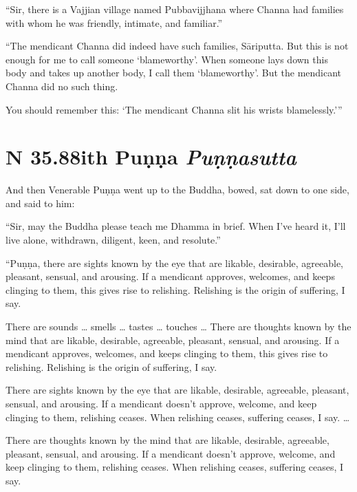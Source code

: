 \documentclass[12pt,openany]{book}%
\newcommand*{\suttatitleacronym}[1]{\smaller[2]{#1}\vspace*{.3em}}
\newcommand*{\suttatitletranslation}[1]{\linebreak{#1}}
\newcommand*{\suttatitleroot}[1]{\linebreak\smaller[2]\itshape{#1}}
\newcommand*{\tocacronym}[1]{\hspace*{-3.3em}{#1}\quad}
\newcommand*{\toctranslation}[1]{#1}
\newcommand*{\tocroot}[1]{(\textit{#1})}
\begin{document}
“Sir, there is a Vajjian village named Pubbavijjhana where Channa had families with whom he was friendly, intimate, and familiar.” 

“The mendicant Channa did indeed have such families, \textsanskrit{Sāriputta}. But this is not enough for me to call someone ‘blameworthy’. When someone lays down this body and takes up another body, I call them ‘blameworthy’. But the mendicant Channa did no such thing. 

You should remember this: ‘The mendicant Channa slit his wrists blamelessly.’” 

%
\section*{{\suttatitleacronym SN 35.88}{\suttatitletranslation With Puṇṇa }{\suttatitleroot Puṇṇasutta}}
\addcontentsline{toc}{section}{\tocacronym{SN 35.88} \toctranslation{With Puṇṇa } \tocroot{Puṇṇasutta}}

And then Venerable \textsanskrit{Puṇṇa} went up to the Buddha, bowed, sat down to one side, and said to him: 

“Sir, may the Buddha please teach me Dhamma in brief. When I’ve heard it, I’ll live alone, withdrawn, diligent, keen, and resolute.” 

“\textsanskrit{Puṇṇa}, there are sights known by the eye that are likable, desirable, agreeable, pleasant, sensual, and arousing. If a mendicant approves, welcomes, and keeps clinging to them, this gives rise to relishing. Relishing is the origin of suffering, I say. 

There are sounds … smells … tastes … touches … There are thoughts known by the mind that are likable, desirable, agreeable, pleasant, sensual, and arousing. If a mendicant approves, welcomes, and keeps clinging to them, this gives rise to relishing. Relishing is the origin of suffering, I say. 

There are sights known by the eye that are likable, desirable, agreeable, pleasant, sensual, and arousing. If a mendicant doesn’t approve, welcome, and keep clinging to them, relishing ceases. When relishing ceases, suffering ceases, I say. … 

There are thoughts known by the mind that are likable, desirable, agreeable, pleasant, sensual, and arousing. If a mendicant doesn’t approve, welcome, and keep clinging to them, relishing ceases. When relishing ceases, suffering ceases, I say. 
\end{document}
